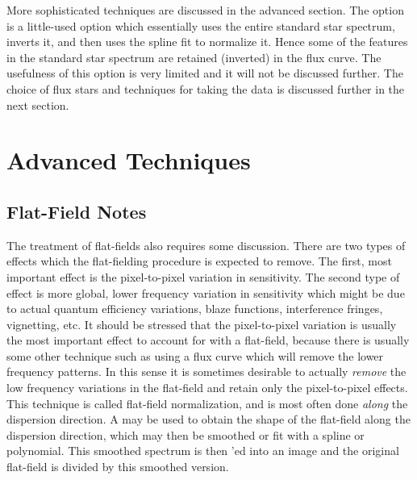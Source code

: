 More sophisticated techniques are discussed in the advanced section.  The
 option is a little-used option which essentially uses the entire
standard star spectrum, inverts it, and then uses the  spline fit
to normalize it. Hence some of the features in the standard star spectrum are
retained (inverted) in the flux curve. The usefulness of this option is very
limited and it will not be discussed further. The choice of flux stars and
techniques for taking the data is discussed further in the next section.

\section{Advanced Techniques}

\subsection{Flat-Field Notes}

The treatment of flat-fields also requires some discussion.  There are two
types of effects which the flat-fielding procedure is expected to remove.  The
first, most important effect is the pixel-to-pixel variation in sensitivity.
The second type of effect is more global, lower frequency variation in
sensitivity which might be due to actual quantum efficiency variations, blaze
functions, interference fringes, vignetting, etc.  It should be stressed that
the pixel-to-pixel variation is usually the most important effect to account
for with a flat-field, because there is usually some other technique such as
using a flux curve which will remove the lower frequency patterns.  In this
sense it is sometimes desirable to actually {\it remove} the low frequency
variations in the flat-field and retain only the pixel-to-pixel effects.  This
technique is called flat-field normalization, and is most often done {\it
along} the dispersion direction.  A  may be used to obtain the
shape of the flat-field along the dispersion direction, which may then be
smoothed or fit with a spline or polynomial.  This smoothed spectrum is then
'ed into an image and the original flat-field is divided by this
smoothed version.

